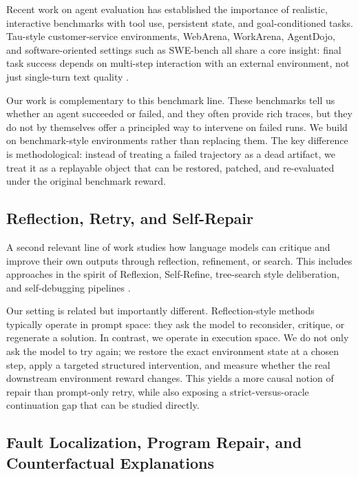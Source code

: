 \documentclass[11pt]{article}
\begin{document}
Recent work on agent evaluation has established the importance of realistic,
interactive benchmarks with tool use, persistent state, and goal-conditioned
tasks. Tau-style customer-service environments, WebArena, WorkArena,
AgentDojo, and software-oriented settings such as SWE-bench all share a core
insight: final task success depends on multi-step interaction with an external
environment, not just single-turn text quality
\citep{tau_style,web_arena,work_arena,agent_dojo,swe_bench}.

Our work is complementary to this benchmark line. These benchmarks tell us
whether an agent succeeded or failed, and they often provide rich traces, but
they do not by themselves offer a principled way to intervene on failed runs.
We build on benchmark-style environments rather than replacing them. The key
difference is methodological: instead of treating a failed trajectory as a dead
artifact, we treat it as a replayable object that can be restored, patched, and
re-evaluated under the original benchmark reward.

\subsection{Reflection, Retry, and Self-Repair}

A second relevant line of work studies how language models can critique and
improve their own outputs through reflection, refinement, or search. This
includes approaches in the spirit of Reflexion, Self-Refine, tree-search style
deliberation, and self-debugging pipelines
\citep{reflexion,self_refine,tree_of_thoughts,self_debugging}.

Our setting is related but importantly different. Reflection-style methods
typically operate in prompt space: they ask the model to reconsider, critique,
or regenerate a solution. In contrast, we operate in execution space. We do
not only ask the model to try again; we restore the exact environment state at
a chosen step, apply a targeted structured intervention, and measure whether
the real downstream environment reward changes. This yields a more causal notion
of repair than prompt-only retry, while also exposing a strict-versus-oracle
continuation gap that can be studied directly.

\subsection{Fault Localization, Program Repair, and Counterfactual Explanations}
\end{document}
